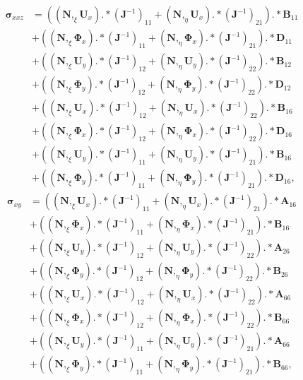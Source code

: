 \documentclass[preprint,12pt]{elsarticle}
\renewcommand{\vec}[1]{\mathbf{#1}}
\renewcommand{\bm}[1]{\mathbf{#1}}
\newcommand{\bs}[1]{\boldsymbol{#1}}
\begin{document}
	\begin{equation}
	\begin{split}
	\bs{\sigma}_{xxz}&=\left((\bm{N},_{\xi}\vec{U}_x).*(\vec{J}^{-1})_{11}+(\bm{N},_{\eta}\vec{U}_x).*(\vec{J}^{-1})_{21}\right).*\vec{B}_{11}\\
	&+\left((\bm{N},_{\xi}\bs{\Phi}_x).*(\vec{J}^{-1})_{11}+(\bm{N},_{\eta}\bs{\Phi}_x).*(\vec{J}^{-1})_{21}\right).*\vec{D}_{11}\\
	&+\left((\bm{N},_{\xi}\vec{U}_y).*(\vec{J}^{-1})_{12}+(\bm{N},_{\eta}\vec{U}_y).*(\vec{J}^{-1})_{22}\right).*\vec{B}_{12}\\
	&+\left((\bm{N},_{\xi}\bs{\Phi}_y).*(\vec{J}^{-1})_{12}+(\bm{N},_{\eta}\bs{\Phi}_y).*(\vec{J}^{-1})_{22}\right).*\vec{D}_{12}\\
	&+\left((\bm{N},_{\xi}\vec{U}_x).*(\vec{J}^{-1})_{12}+(\bm{N},_{\eta}\vec{U}_x).*(\vec{J}^{-1})_{22}\right).*\vec{B}_{16}\\
	&+\left((\bm{N},_{\xi}\bs{\Phi}_x).*(\vec{J}^{-1})_{12}+(\bm{N},_{\eta}\bs{\Phi}_x).*(\vec{J}^{-1})_{22}\right).*\vec{D}_{16}\\
	&+\left((\bm{N},_{\xi}\vec{U}_y).*(\vec{J}^{-1})_{11}+(\bm{N},_{\eta}\vec{U}_y).*(\vec{J}^{-1})_{21}\right).*\vec{B}_{16}\\
	&+\left((\bm{N},_{\xi}\bs{\Phi}_y).*(\vec{J}^{-1})_{11}+(\bm{N},_{\eta}\bs{\Phi}_y).*(\vec{J}^{-1})_{21}\right).*\vec{D}_{16},
	\end{split}
	\end{equation}
	\begin{equation}
	\begin{split}
	\bs{\sigma}_{xy}&=\left((\bm{N},_{\xi}\vec{U}_x).*(\vec{J}^{-1})_{11}+(\bm{N},_{\eta}\vec{U}_x).*(\vec{J}^{-1})_{21}\right).*\vec{A}_{16}\\
	&+\left((\bm{N},_{\xi}\bs{\Phi}_x).*(\vec{J}^{-1})_{11}+(\bm{N},_{\eta}\bs{\Phi}_x).*(\vec{J}^{-1})_{21}\right).*\vec{B}_{16}\\
	&+\left((\bm{N},_{\xi}\vec{U}_y).*(\vec{J}^{-1})_{12}+(\bm{N},_{\eta}\vec{U}_y).*(\vec{J}^{-1})_{22}\right).*\vec{A}_{26}\\
	&+\left((\bm{N},_{\xi}\bs{\Phi}_y).*(\vec{J}^{-1})_{12}+(\bm{N},_{\eta}\bs{\Phi}_y).*(\vec{J}^{-1})_{22}\right).*\vec{B}_{26}\\
	&+\left((\bm{N},_{\xi}\vec{U}_x).*(\vec{J}^{-1})_{12}+(\bm{N},_{\eta}\vec{U}_x).*(\vec{J}^{-1})_{22}\right).*\vec{A}_{66}\\
	&+\left((\bm{N},_{\xi}\bs{\Phi}_x).*(\vec{J}^{-1})_{12}+(\bm{N},_{\eta}\bs{\Phi}_x).*(\vec{J}^{-1})_{22}\right).*\vec{B}_{66}\\
	&+\left((\bm{N},_{\xi}\vec{U}_y).*(\vec{J}^{-1})_{11}+(\bm{N},_{\eta}\vec{U}_y).*(\vec{J}^{-1})_{21}\right).*\vec{A}_{66}\\
	&+\left((\bm{N},_{\xi}\bs{\Phi}_y).*(\vec{J}^{-1})_{11}+(\bm{N},_{\eta}\bs{\Phi}_y).*(\vec{J}^{-1})_{21}\right).*\vec{B}_{66},
	\end{split}
	\end{equation}
\end{document}
